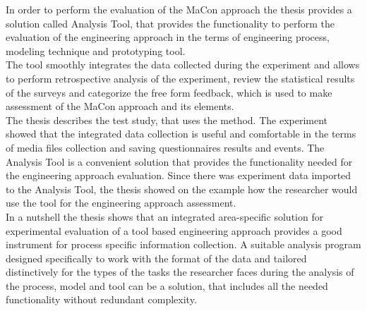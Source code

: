 In order to perform the evaluation of the MaCon approach the thesis provides a solution called Analysis Tool, that provides the functionality to perform the evaluation of the engineering approach in the terms of engineering process, modeling technique and prototyping tool.\\

The tool smoothly integrates the data collected during the experiment and allows to perform retrospective analysis of the experiment, review the statistical results of the surveys and categorize the free form feedback, which is used to make assessment of the MaCon approach and its elements.\\

The thesis describes the test study, that uses the method. The experiment showed that the integrated data collection is useful and comfortable in the terms of media files collection and saving questionnaires results and events. The Analysis Tool is a convenient solution that provides the functionality needed for the engineering approach evaluation. Since there was experiment data imported to the Analysis Tool, the thesis showed on the example how the researcher would use the tool for the engineering approach assessment.\\ 

In a nutshell the thesis shows that an integrated area-specific solution for experimental evaluation of a tool based engineering approach provides a good instrument for process specific information collection. A suitable analysis program designed specifically to work with the format of the data and tailored distinctively for the types of the tasks the researcher faces during the analysis of the process, model and tool can be a solution, that includes all the needed functionality without redundant complexity.  


